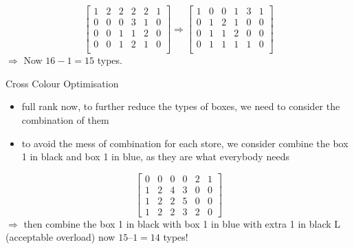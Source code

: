 \begin{frame}
\begin{frame}
\begin{equation}
    \begin{bmatrix}
        1&2&2&2&2&1\\
        0&0&0&3&1&0\\
        0&0&1&1&2&0\\
        0&0&1&2&1&0\\
    \end{bmatrix} \Rightarrow \begin{bmatrix}
	    1& 0& 0& 1& 3& 1\\
	    0& 1& 2& 1& 0& 0\\
	    0& 1& 1& 2& 0& 0\\
	    0& 1& 1& 1& 1& 0 \\
    \end{bmatrix}
	\end{equation}
    $\Rightarrow$ Now $16-1=15$ types.
\end{frame}
\begin{frame}{Cross Colour Optimisation}
	\begin{itemize}
	\item full rank now, to further reduce the types of boxes, we need to consider the combination of them
	\item to avoid the mess of combination for each store, we consider combine the box 1 in black and box 1 in blue, as they are what everybody needs
	\end{itemize}
    \begin{equation}
        \begin{bmatrix}
            0& 0& 0& 0& 2& 1\\
            1& 2& 4& 3& 0& 0 \\
             1& 2& 2& 5& 0& 0\\
             1& 2& 2& 3& 2& 0
        \end{bmatrix}
    \end{equation}
			$\Rightarrow$ then combine the box 1 in black with box 1 in blue with extra 1 in black L (acceptable overload)
now $15 – 1 = 14$ types!
	\end{frame}





\end{frame}
